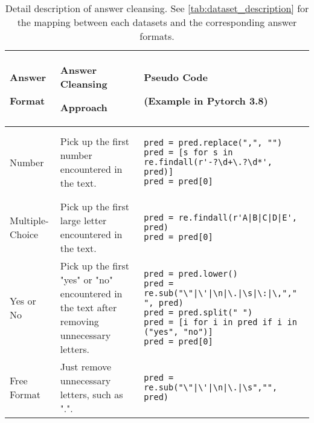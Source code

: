 \documentclass{article}
\begin{document}

\begin{table}[h]\centering
\caption{Detail description of answer cleansing. See \autoref{tab:dataset_description} for the mapping between each datasets and the corresponding answer formats.}
\label{tab:answer_cleansing}
\begin{tabular}{p{}p{}p{}}
\toprule
Answer \par Format &Answer Cleansing \par Approach &Pseudo Code \par (Example in Pytorch 3.8) \\\midrule \midrule
Number &Pick up the first number encountered in the text. &
\begin{lstlisting}
pred = pred.replace(",", "")
pred = [s for s in re.findall(r'-?\d+\.?\d*', pred)]
pred = pred[0] 
\end{lstlisting}

\\
\midrule

Multiple-Choice &Pick up the first large letter encountered in the text. &
\begin{lstlisting}
pred = re.findall(r'A|B|C|D|E', pred) 
pred = pred[0]
\end{lstlisting}

\\\midrule

Yes or No &Pick up the first "yes" or "no" encountered in the text after removing unnecessary letters. &
\begin{lstlisting}
pred = pred.lower()
pred = re.sub("\"|\'|\n|\.|\s|\:|\,"," ", pred) 
pred = pred.split(" ") 
pred = [i for i in pred if i in ("yes", "no")] 
pred = pred[0]
\end{lstlisting}

\\\midrule

Free Format &Just remove unnecessary letters, such as ".". &
\begin{lstlisting}
pred = re.sub("\"|\'|\n|\.|\s","", pred)
\end{lstlisting}

\\

\bottomrule
\end{tabular}
\end{table} 
\end{document}
